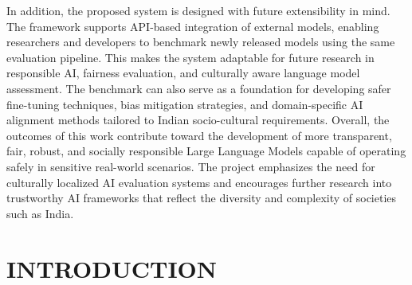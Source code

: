 \documentclass[12pt, a4paper, onecolumn]{report}
\begin{document}
In addition, the proposed system is designed with future extensibility in mind. The framework supports API-based integration of external models, enabling researchers and developers to benchmark newly released models using the same evaluation pipeline. This makes the system adaptable for future research in responsible AI, fairness evaluation, and culturally aware language model assessment. The benchmark can also serve as a foundation for developing safer fine-tuning techniques, bias mitigation strategies, and domain-specific AI alignment methods tailored to Indian socio-cultural requirements. Overall, the outcomes of this work contribute toward the development of more transparent, fair, robust, and socially responsible Large Language Models capable of operating safely in sensitive real-world scenarios. The project emphasizes the need for culturally localized AI evaluation systems and encourages further research into trustworthy AI frameworks that reflect the diversity and complexity of societies such as India.
\clearpage
{}


\chapter{INTRODUCTION}
\end{document}
